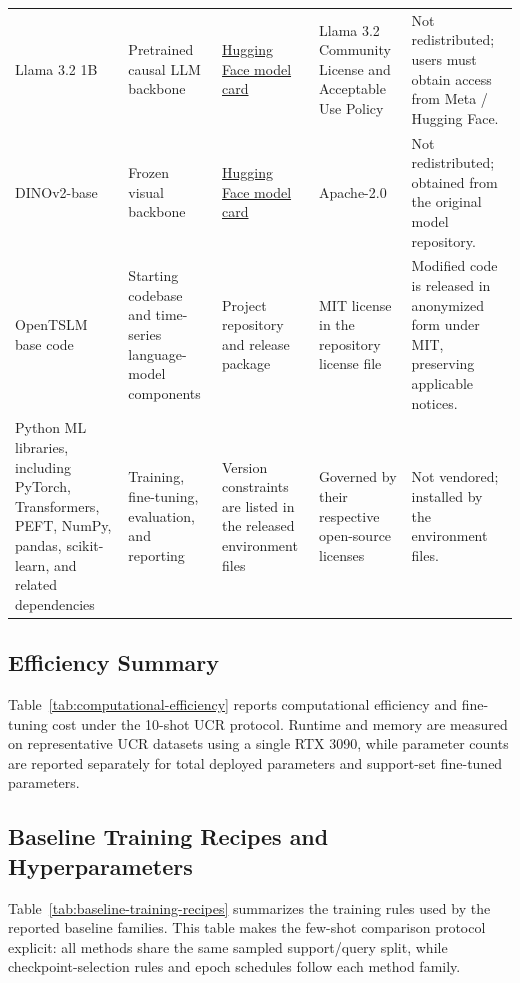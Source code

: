 \documentclass[10pt,journal,compsoc]{IEEEtran}
\begin{document}
\begin{longtable}{p{2.0cm}p{1.7cm}p{3.0cm}p{3.0cm}p{2.7cm}}
Llama 3.2 1B & Pretrained causal LLM backbone & \href{https://huggingface.co/meta-llama/Llama-3.2-1B}{Hugging Face model card} & Llama 3.2 Community License and Acceptable Use Policy & Not redistributed; users must obtain access from Meta / Hugging Face. \\
DINOv2-base & Frozen visual backbone & \href{https://huggingface.co/facebook/dinov2-base}{Hugging Face model card} & Apache-2.0 & Not redistributed; obtained from the original model repository. \\
OpenTSLM base code & Starting codebase and time-series language-model components & Project repository and release package & MIT license in the repository license file & Modified code is released in anonymized form under MIT, preserving applicable notices. \\
Python ML libraries, including PyTorch, Transformers, PEFT, NumPy, pandas, scikit-learn, and related dependencies & Training, fine-tuning, evaluation, and reporting & Version constraints are listed in the released environment files & Governed by their respective open-source licenses & Not vendored; installed by the environment files. \\
\end{longtable}
\endgroup

\subsection{Efficiency Summary}
\label{app:efficiency-summary}

Table~\ref{tab:computational-efficiency} reports computational efficiency and fine-tuning cost under the 10-shot UCR protocol. Runtime and memory are measured on representative UCR datasets using a single RTX 3090, while parameter counts are reported separately for total deployed parameters and support-set fine-tuned parameters.



\subsection{Baseline Training Recipes and Hyperparameters}
\label{app:baseline-details}

Table~\ref{tab:baseline-training-recipes} summarizes the training rules used by the reported baseline families.
This table makes the few-shot comparison protocol explicit: all methods share the same sampled support/query split, while checkpoint-selection rules and epoch schedules follow each method family.
\end{document}

